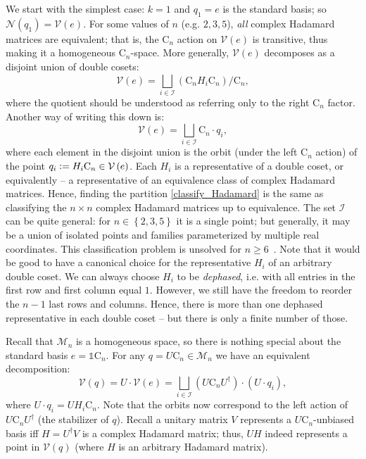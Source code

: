 \documentclass[referee,sn-mathphys-num]{sn-jnl}%
\theoremstyle{thmstyleone}%
\theoremstyle{thmstyletwo}%
\theoremstyle{remark}
\theoremstyle{thmstylethree}%
\newcommand{\defeq}{\vcentcolon=}
\begin{document}
We start with the simplest case: $k=1$ and $q_1 = e$ is the standard basis; so $ \mathcal{N} \left( q_1 \right) = \mathcal{V} \left( e \right) $.
For some values of $n$ (e.g. $2,3,5$), \textit{all} complex Hadamard matrices are equivalent; that is, the $ \mathrm{C}_n $ action on $ \mathcal{V} \left( e \right) $ is transitive, thus making it a homogeneous $ \mathrm{C}_n $-space. More generally, $ \mathcal{V} \left( e \right) $ decomposes as a disjoint union of double cosets:
\begin{equation}\label{double_cosets}
	\mathcal{V} \left( e \right) = \bigsqcup_{i \in \mathcal{I}}  \left( \mathrm{C}_n H_i \mathrm{C}_n \right) / \mathrm{C}_n ,
\end{equation}
where the quotient should be understood as referring only to the right $ \mathrm{C}_n $ factor. Another way of writing this down is:
\begin{equation}\label{classify_Hadamard}
	\mathcal{V} \left( e \right) = \bigsqcup_{i \in \mathcal{I}} \mathrm{C}_n \cdot q_i ,
\end{equation}
where each element in the disjoint union is the orbit (under the left $\mathrm{C}_n$ action) of the point $q_i \defeq H_i \mathrm{C}_n \in \mathcal{V} \left( e \right) $. Each $H_i$ is a representative of a double coset, or equivalently -- a representative of an equivalence class of complex Hadamard matrices.
Hence, finding the partition \eqref{classify_Hadamard} is the same as classifying the $n \times n$ complex Hadamard matrices up to equivalence. The set $ \mathcal{I} $ can be quite general: for $n \in \left\{ 2,3,5 \right\}$ it is a single point; but generally, it may be a union of isolated points and families parameterized by multiple real coordinates. This classification problem is unsolved for $ n \geq 6 $~\cite{dita2004some,tadej2006concise}. Note that it would be good to have a canonical choice for the representative $H_i$ of an arbitrary double coset.
We can always choose $H_i$ to be \textit{dephased}, i.e. with all entries in the first row and first column equal $1$. However, we still have the freedom to reorder the $n-1$ last rows and columns. Hence, there is more than one dephased representative in each double coset -- but there is only a finite number of those.

Recall that $\mathcal{M}_n$ is a homogeneous space, so there is nothing special about the standard basis $e = \mathds{1} \mathrm{C}_n$. For any $q = U \mathrm{C}_n \in \mathcal{M}_n$ 
we have an equivalent decomposition:
\begin{equation}\label{V_decomp}
	\mathcal{V} \left( q \right) = U \cdot \mathcal{V} \left( e \right) = \bigsqcup_{i \in \mathcal{I}} \left( U \mathrm{C}_n U^\dagger \right) \cdot \left( U \cdot q_i \right) ,
\end{equation}
where $ U \cdot q_i = U H_i \mathrm{C}_n $.
Note that the orbits now correspond to the left action of $ U \mathrm{C}_n U^\dagger $ (the stabilizer of $ q $).
Recall a unitary matrix $ V $ represents a $U\mathrm{C}_n$-unbiased basis iff $ H = U^\dagger V $ is a complex Hadamard matrix; thus, $UH$ indeed represents a point in $ \mathcal{V} \left( q \right) $ (where $H$ is an arbitrary Hadamard matrix).
\end{document}
